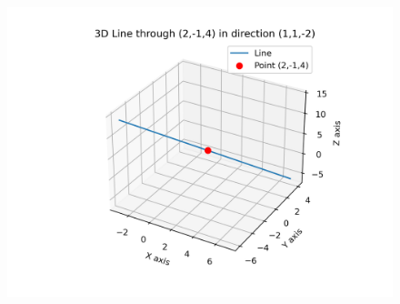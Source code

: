 \documentclass[journal]{IEEEtran}
\begin{document}
\begin{figure}[h!]
    \centering
    \includegraphics[height=0.3\textheight, keepaspectratio]{figs/linefig.png}
    \label{figure_1}
\end{figure}
 
\end{document}
